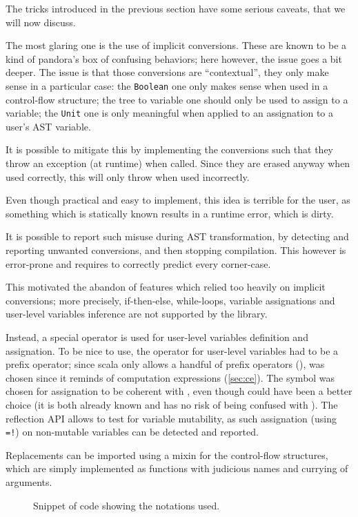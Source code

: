 \label{sec:caveats}

The tricks introduced in the previous section have some serious caveats,
that we will now discuss.

The most glaring one is the use of implicit conversions. 
These are known to be a kind of pandora's box of confusing behaviors; here however, the issue goes a bit deeper.
The issue is that those conversions are ``contextual'',
they only make sense in a particular case: the \lstinline{Boolean} one only makes sense when used in a control-flow structure;
the tree to variable one should only be used to assign to a variable;
the \lstinline{Unit} one is only meaningful when applied to an assignation to a user's AST variable.



It is possible to mitigate this by implementing the conversions such that they throw an exception (at runtime) when called.
Since they are erased anyway when used correctly, this will only throw when used incorrectly. 

Even though practical and easy to implement, 
this idea is terrible for the user, as something which is statically known results in a runtime error, which is dirty.

It is possible to report such misuse during AST transformation, by detecting and reporting unwanted conversions, and then stopping compilation.
This however is error-prone and requires to correctly predict every corner-case.

This motivated the abandon of features which relied too heavily on implicit conversions; 
more precisely, if-then-else, while-loops, variable assignations and user-level variables inference are not supported by the library.

Instead, a special operator is used for user-level variables definition and assignation.
To be nice to use, the operator for user-level variables had to be a prefix operator; since scala only allows a handful of prefix operators (\scalasnippet{+, -, !, ~}),
\scalasnippet{!} was chosen since it reminds of \Fsharp{} computation expressions (\cref{sec:ce}).
The symbol \scalasnippet{=!} was chosen for assignation to be coherent with \scalasnippet{!}, even though \scalasnippet{:=} could have been a better choice (it is both already known and has no risk of being confused with \scalasnippet{!=}).
The reflection API allows to test for variable mutability,
as such assignation (using \lstinline{=!}) on non-mutable variables can be detected and reported.

Replacements can be imported using a mixin for the control-flow structures, which are simply implemented as functions with judicious names and currying of arguments.

\begin{figure}[h]

\caption{Snippet of code showing the notations used.}
\end{figure}